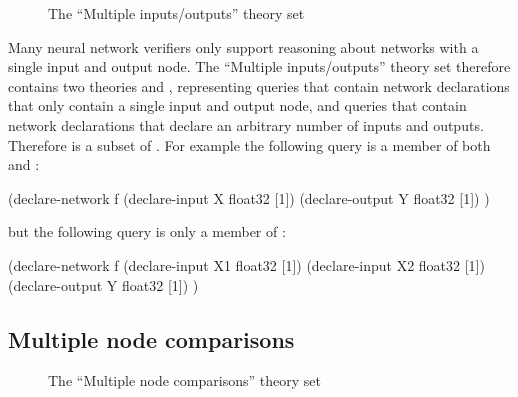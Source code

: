 \begin{figure}[h]
\centering
{}
\caption{The ``Multiple inputs/outputs'' theory set}
\label{fig:multiple-inputs-outputs-set}
\end{figure}

Many neural network verifiers only support reasoning about networks with a single input and output node. The ``Multiple inputs/outputs'' theory set therefore contains two theories \sio{} and \mio{}, representing queries that contain network declarations that only contain a single input and output node, and queries that contain network declarations that declare an arbitrary number of inputs and outputs. Therefore \sio{} is a subset of \mio{}. For example the following query is a member of both \sio{} and \mio{}:

\begin{code}[style=lbnf]
(declare-network f
    (declare-input  X float32 [1])
    (declare-output Y float32 [1])
)
\end{code}

but the following query is only a member of \mio{}:

\begin{code}[style=lbnf]
(declare-network f
    (declare-input  X1 float32 [1])
    (declare-input  X2 float32 [1])
    (declare-output Y  float32 [1])
)
\end{code}

\subsection{Multiple node comparisons}
\label{sec:multi-node-comparisons}

\begin{figure}[h]
\centering
{}
\caption{The ``Multiple node comparisons'' theory set}
\label{fig:multi-node-comparisons-theory-set}
\end{figure}

